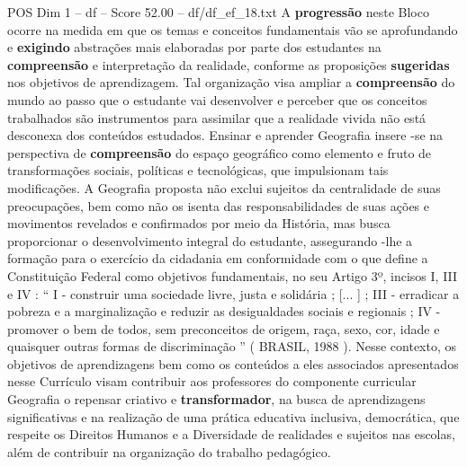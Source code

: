 \begin{textsample}{POS Dim 1 – df – Score 52.00 – df/df\_ef\_18.txt}
A \textbf{progressão} neste Bloco ocorre na medida em que os temas e conceitos fundamentais vão se aprofundando e \textbf{exigindo} abstrações mais elaboradas por parte dos estudantes na \textbf{compreensão} e interpretação da realidade, conforme as proposições \textbf{sugeridas} nos objetivos de aprendizagem.
Tal organização visa ampliar a \textbf{compreensão} do mundo ao passo que o estudante vai desenvolver e perceber que os conceitos trabalhados são instrumentos para assimilar que a realidade vivida não está desconexa dos conteúdos estudados.
Ensinar e aprender Geografia insere -se na perspectiva de \textbf{compreensão} do espaço geográfico como elemento e fruto de transformações sociais, políticas e tecnológicas, que impulsionam tais modificações.
A Geografia proposta não exclui sujeitos da centralidade de suas preocupações, bem como não os isenta das responsabilidades de suas ações e movimentos revelados e confirmados por meio da História, mas busca proporcionar o desenvolvimento integral do estudante, assegurando -lhe a formação para o exercício da cidadania em conformidade com o que define a Constituição Federal como objetivos fundamentais, no seu Artigo 3º, incisos I, III e IV : “ I - construir uma sociedade livre, justa e solidária ; [... ] ; III - erradicar a pobreza e a marginalização e reduzir as desigualdades sociais e regionais ; IV - promover o bem de todos, sem preconceitos de origem, raça, sexo, cor, idade e quaisquer outras formas de discriminação ” ( BRASIL, 1988 ).
Nesse contexto, os objetivos de aprendizagens bem como os conteúdos a eles associados apresentados nesse Currículo visam contribuir aos professores do componente curricular Geografia o repensar criativo e \textbf{transformador}, na busca de aprendizagens significativas e na realização de uma prática educativa inclusiva, democrática, que respeite os Direitos Humanos e a Diversidade de realidades e sujeitos nas escolas, além de contribuir na organização do trabalho pedagógico.

\end{textsample}
